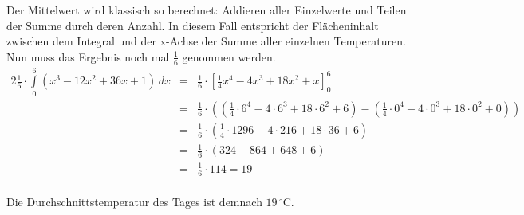\documentclass[10pt,a4paper,oneside,ngerman,numbers=noenddot]{scrartcl}
\begin{document}
\subsubsection{} %
Der Mittelwert wird klassisch so berechnet: Addieren aller Einzelwerte und Teilen der Summe durch deren Anzahl. In diesem Fall entspricht der Flächeninhalt zwischen dem Integral und der x-Achse der Summe aller einzelnen Temperaturen. Nun muss das Ergebnis noch mal $\frac{1}{6}$ genommen werden.\\
\begin{alignat*}{2}
\frac{1}{6} \cdot \int\limits_{0}^{6} (x^{3} - 12x^{2} + 36x +1) \,dx &=& \frac{1}{6} \cdot \left[\frac{1}{4}x^{4} - 4x^{3} + 18x^{2} + x \right]_{0}^{6} \\
&=& \frac{1}{6} \cdot \left(\left(\frac{1}{4} \cdot 6^{4} - 4 \cdot 6^{3} + 18 \cdot 6^{2} + 6 \right) - \left(\frac{1}{4} \cdot 0^{4} - 4 \cdot 0^{3} + 18 \cdot 0^{2} + 0 \right)\right) \\ 
&=& \frac{1}{6} \cdot \left(\frac{1}{4} \cdot 1296 - 4 \cdot 216 + 18 \cdot 36 + 6 \right)\\ 
&=& \frac{1}{6} \cdot \left(324 - 864 + 648 + 6 \right) \\
&=& \frac{1}{6} \cdot 114 = 19
\end{alignat*}\\
Die Durchschnittstemperatur des Tages ist demnach $19\,^{\circ} \mathrm{C}$.
\end{document}
